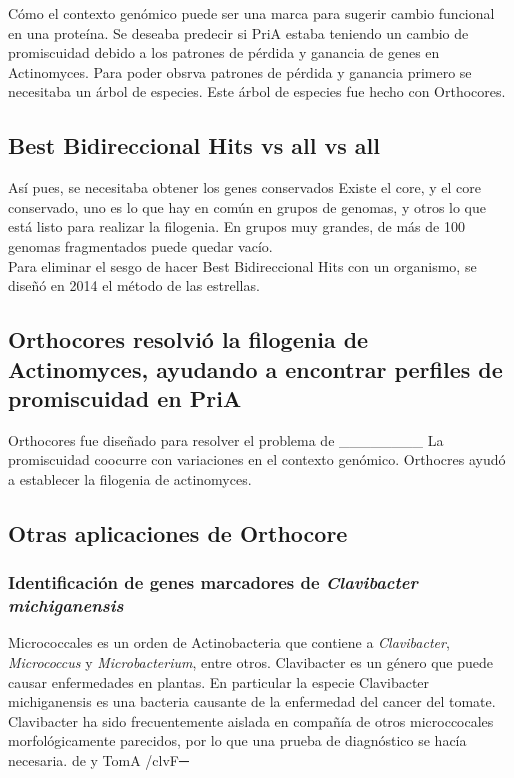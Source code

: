 \documentclass[]{article}
\begin{document}
Cómo el contexto genómico puede ser una marca para sugerir cambio
funcional en una proteína. Se deseaba predecir si PriA estaba teniendo
un cambio de promiscuidad debido a los patrones de pérdida y ganancia de
genes en Actinomyces. Para poder obsrva patrones de pérdida y ganancia
primero se necesitaba un árbol de especies. Este árbol de especies fue
hecho con Orthocores.

\subsection{Best Bidireccional Hits vs all vs
all}\label{best-bidireccional-hits-vs-all-vs-all}

Así pues, se necesitaba obtener los genes conservados Existe el core, y
el core conservado, uno es lo que hay en común en grupos de genomas, y
otros lo que está listo para realizar la filogenia. En grupos muy
grandes, de más de 100 genomas fragmentados puede quedar vacío.\\
Para eliminar el sesgo de hacer Best Bidireccional Hits con un
organismo, se diseñó en 2014 el método de las estrellas.

\subsection{Orthocores resolvió la filogenia de Actinomyces, ayudando a
encontrar perfiles de promiscuidad en
PriA}\label{orthocores-resolvio-la-filogenia-de-actinomyces-ayudando-a-encontrar-perfiles-de-promiscuidad-en-pria}

Orthocores fue diseñado para resolver el problema de \_\_\_\_\_\_\_\_ La
promiscuidad coocurre con variaciones en el contexto genómico. Orthocres
ayudó a establecer la filogenia de actinomyces.

\subsection{Otras aplicaciones de
Orthocore}\label{otras-aplicaciones-de-orthocore}

\subsubsection{\texorpdfstring{Identificación de genes marcadores de
\emph{Clavibacter
michiganensis}}{Identificación de genes marcadores de Clavibacter michiganensis}}\label{identificacion-de-genes-marcadores-de-clavibacter-michiganensis}

Micrococcales es un orden de Actinobacteria que contiene a
\emph{Clavibacter}, \emph{Micrococcus} y \emph{Microbacterium}, entre
otros. Clavibacter es un género que puede causar enfermedades en
plantas. En particular la especie Clavibacter michiganensis es una
bacteria causante de la enfermedad del cancer del tomate. Clavibacter ha
sido frecuentemente aislada en compañía de otros microccocales
morfológicamente parecidos, por lo que una prueba de diagnóstico se
hacía necesaria. de y TomA /clvF─
\end{document}
